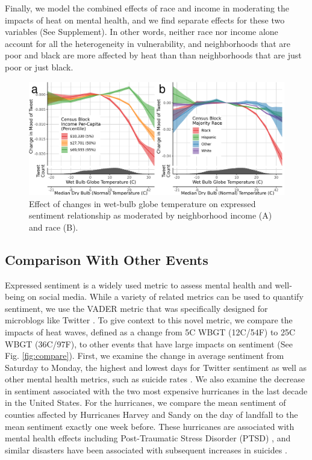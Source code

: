 \documentclass[fleqn,10pt]{wlscirep}
\begin{document}
Finally, we model the combined effects of race and income in moderating the impacts of heat on mental health, and we find separate effects for these two variables (See Supplement).  In other words, neither race nor income alone account for all the heterogeneity in vulnerability, and neighborhoods that are poor and black are more affected by heat than than neighborhoods that are just poor or just black.

\begin{figure}[H]
\centering
  \includegraphics[width=\linewidth]{../res/wbgt_combined.png}
    \caption{Effect of changes in wet-bulb globe temperature on expressed sentiment relationship as moderated by neighborhood income (A) and race (B).}
\label{fig:hetero}
\end{figure}


\subsection*{Comparison With Other Events}

Expressed sentiment is a widely used metric to assess mental health and well-being on social media.  While a variety of related metrics can be used to quantify sentiment, we use the VADER metric that was specifically designed for microblogs like Twitter \cite{hutto2014vader}.  To give context to this novel metric, we compare the impacts of heat waves, defined as a change from 5\textdegree C WBGT (12\textdegree C/54\textdegree F) to 25\textdegree C WBGT (36\textdegree C/97\textdegree F), to other events that have large impacts on sentiment (See Fig. \ref{fig:compare}).  First, we examine the change in average sentiment from Saturday to Monday, the highest and lowest days for Twitter sentiment as well as other mental health metrics, such as suicide rates \cite{CDC2021}.  We also examine the decrease in sentiment associated with the two most expensive hurricanes in the last decade in the United States.  For the hurricanes, we compare the mean sentiment of counties affected by Hurricanes Harvey and Sandy on the day of landfall to the mean sentiment exactly one week before.  These hurricanes are associated with mental health effects including Post-Traumatic Stress Disorder (PTSD) \cite{Schwartz2017Aug, Schwartz2018May}, and similar disasters have been associated with subsequent increases in suicides \cite{Krug1998Feb}.
\end{document}
